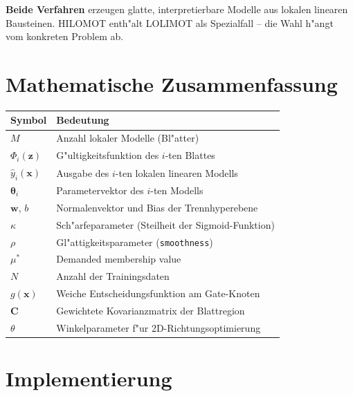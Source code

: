 \documentclass[12pt,a4paper]{article}
\begin{document}
\begin{merkbox}
\textbf{Beide Verfahren} erzeugen glatte, interpretierbare Modelle aus lokalen linearen Bausteinen. HILOMOT enth"alt LOLIMOT als Spezialfall -- die Wahl h"angt vom konkreten Problem ab.
\end{merkbox}

\section{Mathematische Zusammenfassung}

\begin{center}
\begin{tabular}{ll}
  \toprule
  \textbf{Symbol} & \textbf{Bedeutung} \\
  \midrule
  $M$ & Anzahl lokaler Modelle (Bl"atter) \\
  $\Phi_i(\mathbf{z})$ & G"ultigkeitsfunktion des $i$-ten Blattes \\
  $\hat{y}_i(\mathbf{x})$ & Ausgabe des $i$-ten lokalen linearen Modells \\
  $\boldsymbol{\theta}_i$ & Parametervektor des $i$-ten Modells \\
  $\mathbf{w}$, $b$ & Normalenvektor und Bias der Trennhyperebene \\
  $\kappa$ & Sch"arfeparameter (Steilheit der Sigmoid-Funktion) \\
  $\rho$ & Gl"attigkeitsparameter (\texttt{smoothness}) \\
  $\mu^*$ & Demanded membership value \\
  $N$ & Anzahl der Trainingsdaten \\
  $g(\mathbf{x})$ & Weiche Entscheidungsfunktion am Gate-Knoten \\
  $\mathbf{C}$ & Gewichtete Kovarianzmatrix der Blattregion \\
  $\theta$ & Winkelparameter f"ur 2D-Richtungsoptimierung \\
  \bottomrule
\end{tabular}
\end{center}

\section{Implementierung}
\end{document}
